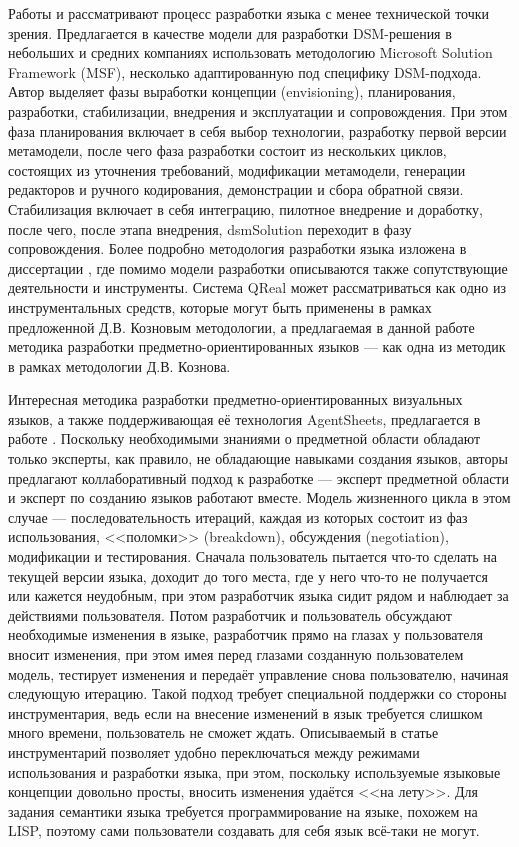 Работы \cite{koznov2011process} и \cite{koznov2008development} рассматривают процесс 
разработки языка с менее технической точки зрения. Предлагается в качестве модели 
для разработки \ac{DSM}-решения в небольших и средних компаниях использовать методологию 
Microsoft Solution Framework (MSF), несколько адаптированную под специфику \ac{DSM}-подхода. 
Автор выделяет фазы выработки концепции (envisioning), планирования, разработки, стабилизации, 
внедрения и эксплуатации и сопровождения. При этом фаза планирования включает в себя выбор 
технологии, разработку первой версии метамодели, после чего фаза разработки состоит из нескольких 
циклов, состоящих из уточнения требований, модификации метамодели, генерации редакторов 
и ручного кодирования, демонстрации и сбора обратной связи. Стабилизация включает 
в себя интеграцию, пилотное внедрение и доработку, после чего, после этапа внедрения, 
\ac{dsmSolution} переходит в фазу сопровождения. Более подробно методология разработки
языка изложена в диссертации \cite{koznov2016disser}, где помимо модели разработки
описываются также сопутствующие деятельности и инструменты. Система
QReal может рассматриваться как одно из инструментальных средств, которые могут быть применены
в рамках предложенной Д.В. Козновым методологии, а предлагаемая в данной работе методика
разработки предметно-ориентированных языков --- как одна из методик в рамках методологии
Д.В. Кознова.

Интересная методика разработки предметно-ориентированных визуальных языков, а также поддерживающая 
её технология AgentSheets, предлагается в работе \cite{repenning1995agentsheets}. Поскольку необходимыми знаниями о предметной 
области обладают только эксперты, как правило, не обладающие навыками создания языков, 
авторы предлагают коллаборативный подход к разработке --- эксперт предметной области 
и эксперт по созданию языков работают вместе. Модель жизненного цикла в этом случае 
--- последовательность итераций, каждая из которых состоит из фаз использования, <<поломки>> 
(breakdown), обсуждения (negotiation), модификации и тестирования. Сначала пользователь 
пытается что-то сделать на текущей версии языка, доходит до того места, где у него 
что-то не получается или кажется неудобным, при этом разработчик языка сидит рядом 
и наблюдает за действиями пользователя. Потом разработчик и пользователь обсуждают 
необходимые изменения в языке, разработчик прямо на глазах у пользователя вносит изменения, 
при этом имея перед глазами созданную пользователем модель, тестирует изменения и 
передаёт управление снова пользователю, начиная следующую итерацию. Такой подход требует 
специальной поддержки со стороны инструментария, ведь если на внесение изменений в 
язык требуется слишком много времени, пользователь не сможет ждать. Описываемый в 
статье инструментарий позволяет удобно переключаться между режимами использования и 
разработки языка, при этом, поскольку используемые языковые концепции довольно просты, 
вносить изменения удаётся <<на лету>>. Для задания семантики языка требуется программирование 
на языке, похожем на LISP, поэтому сами пользователи создавать для себя язык всё-таки 
не могут.

